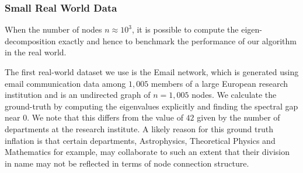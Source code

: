 \documentclass[letterpaper]{article} %
\begin{document}

\subsubsection{Small Real World Data}
%	

When the number of nodes $n \approx 10^{3}$, it is possible to compute the eigen-decomposition exactly and hence to benchmark the performance of our algorithm in the real world. 

The first real-world dataset we use is the Email network, which is generated using email communication data among $1,005$ members of a large European research institution and is an undirected graph of $n=1,005$ nodes. We calculate the ground-truth by computing the eigenvalues explicitly and finding the spectral gap near $0$. %
We note that this differs from the value of $42$ given by the number of departments at the research institute. A likely reason for this ground truth inflation is that certain departments, Astrophysics, Theoretical Physics and Mathematics for example, may collaborate to such an extent that their division in name may not be reflected in terms of node connection structure.
\end{document}

